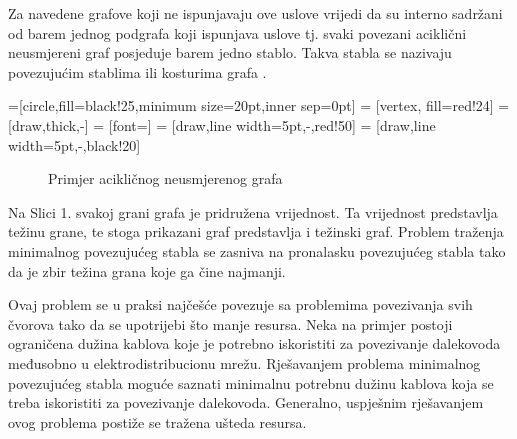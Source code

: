 \documentclass[conference]{IEEEtran}
\begin{document}
Za navedene grafove koji ne ispunjavaju ove uslove vrijedi da su interno sadržani od barem jednog podgrafa koji ispunjava uslove tj. svaki povezani aciklični neusmjereni graf posjeduje barem jedno stablo. Takva stabla se nazivaju povezujućim stablima ili kosturima grafa \cite{b1}.

=[circle,fill=black!25,minimum size=20pt,inner sep=0pt]
 = [vertex, fill=red!24]
 = [draw,thick,-]
 = [font=\small]
 = [draw,line width=5pt,-,red!50]
 = [draw,line width=5pt,-,black!20]

\begin{figure}[H]
\begin{center}
\caption{Primjer acikličnog neusmjerenog grafa}
\end{center}
\end{figure}

Na Slici 1. svakoj grani grafa je pridružena vrijednost. Ta vrijednost predstavlja težinu grane, te stoga prikazani graf predstavlja i težinski graf. Problem traženja minimalnog povezujućeg stabla se zasniva na pronalasku povezujućeg stabla tako da je zbir težina grana koje ga čine najmanji.

Ovaj problem se u praksi najčešće povezuje sa problemima povezivanja svih čvorova tako da se upotrijebi što manje resursa. Neka na primjer postoji ograničena dužina kablova koje je potrebno iskoristiti za povezivanje dalekovoda međusobno u elektrodistribucionu mrežu. Rješavanjem problema minimalnog povezujućeg stabla  moguće saznati minimalnu potrebnu dužinu kablova koja se treba iskoristiti za povezivanje dalekovoda. Generalno, uspješnim rješavanjem ovog problema postiže se tražena ušteda resursa.
\end{document}
